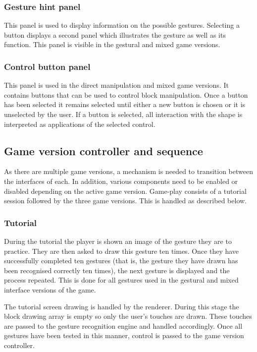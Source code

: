 \subsubsection{Gesture hint panel}
This panel is used to display information on the possible gestures. Selecting a button displays a second panel which illustrates the gesture as well as its function. This panel is visible in the gestural and mixed game versions.

\subsubsection{Control button panel}
This panel is used in the direct manipulation and mixed game versions. It contains buttons that can be used to control block manipulation. Once a button has been selected it remains selected until either a new button is chosen or it is unselected by the user. If a button is selected, all interaction with the shape is interpreted as applications of the selected control.

\subsection{Game version controller and sequence}
As there are multiple game versions, a mechanism is needed to transition between the interfaces of each. In addition, various components need to be enabled or disabled depending on the active game version. Game-play consists of a tutorial session followed by the three game versions. This is handled as described below.

\subsubsection{Tutorial}
During the tutorial the player is shown an image of the gesture they are to practice. They are then asked to draw this gesture ten times. Once they have successfully completed ten gestures (that is, the gesture they have drawn has been recognised correctly ten times), the next gesture is displayed and the process repeated. This is done for all gestures used in the gestural and mixed interface versions of the game.

The tutorial screen drawing is handled by the renderer. During this stage the block drawing array is empty so only the user's touches are drawn. These touches are passed to the gesture recognition engine and handled accordingly. Once all gestures have been tested in this manner, control is passed to the game version controller.

